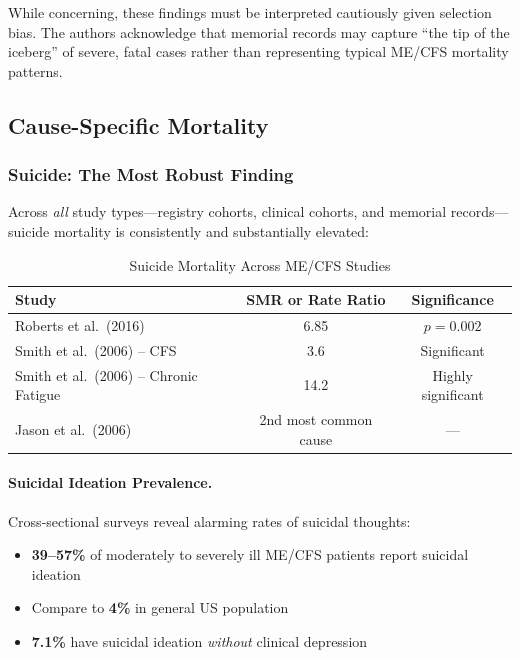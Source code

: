 While concerning, these findings must be interpreted cautiously given selection bias. The authors acknowledge that memorial records may capture ``the tip of the iceberg'' of severe, fatal cases rather than representing typical ME/CFS mortality patterns.

\subsection{Cause-Specific Mortality}
\label{subsec:cause-specific-mortality}

\subsubsection{Suicide: The Most Robust Finding}

Across \textit{all} study types---registry cohorts, clinical cohorts, and memorial records---suicide mortality is consistently and substantially elevated:

\begin{table}[htbp]
\centering
\caption{Suicide Mortality Across ME/CFS Studies}
\label{tab:suicide-mortality}
\begin{tabular}{lcc}
\toprule
\textbf{Study} & \textbf{SMR or Rate Ratio} & \textbf{Significance} \\
\midrule
Roberts et al.\ (2016) & 6.85 & $p = 0.002$ \\
Smith et al.\ (2006) -- CFS & 3.6 & Significant \\
Smith et al.\ (2006) -- Chronic Fatigue & 14.2 & Highly significant \\
Jason et al.\ (2006) & 2nd most common cause & --- \\
\bottomrule
\end{tabular}
\end{table}

\paragraph{Suicidal Ideation Prevalence.}
Cross-sectional surveys reveal alarming rates of suicidal thoughts:
\begin{itemize}
    \item \textbf{39--57\%} of moderately to severely ill ME/CFS patients report suicidal ideation~\cite{Chu2021suicide}
    \item Compare to \textbf{4\%} in general US population
    \item \textbf{7.1\%} have suicidal ideation \textit{without} clinical depression~\cite{Brown2020}
\end{itemize}

